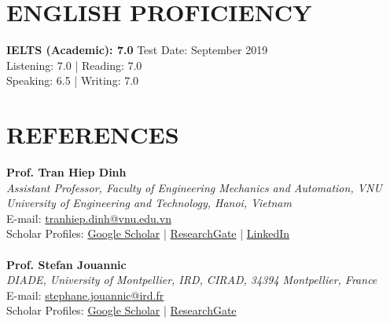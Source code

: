 \documentclass[a4paper,9pt]{extarticle}
\begin{document}
\section*{ENGLISH PROFICIENCY}
\noindent\textbf{IELTS (Academic): 7.0} \hfill Test Date: September 2019\\ 
Listening: 7.0 | Reading: 7.0 \\
Speaking: 6.5 | Writing: 7.0 

\section*{REFERENCES}
\textbf{Prof. Tran Hiep Dinh}\\
\textit{Assistant Professor, Faculty of Engineering Mechanics and Automation, VNU University of Engineering and Technology, Hanoi, Vietnam}\\
E-mail: \href{mailto:tranhiep.dinh@vnu.edu.vn}{tranhiep.dinh@vnu.edu.vn}\\
Scholar Profiles: \href{https://scholar.google.com/citations?user=fJYX_zsAAAAJ&hl=en&oi=ao}{Google Scholar} | \href{https://www.researchgate.net/profile/Tran-Hiep-Dinh}{ResearchGate} | \href{https://www.linkedin.com/in/tran-hiep-dinh/}{LinkedIn}\\ \\
\textbf{Prof. Stefan Jouannic}\\
\textit{DIADE, University of Montpellier, IRD, CIRAD, 34394 Montpellier, France}\\
E-mail: \href{mailto:stephane.jouannic@ird.fr}{stephane.jouannic@ird.fr}\\
Scholar Profiles: \href{https://scholar.google.com/citations?user=y5kP-ZAAAAAJ&hl=vi}{Google Scholar} | \href{https://www.researchgate.net/profile/Stefan-Jouannic}{ResearchGate}\\ \\

\end{document}
